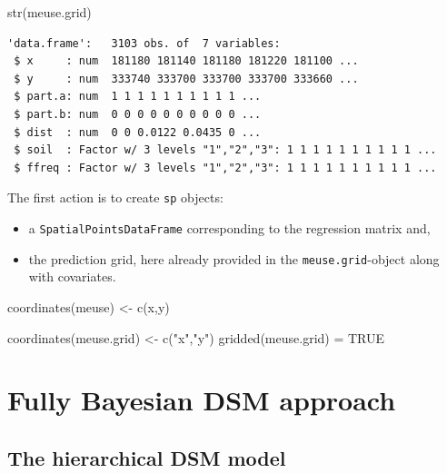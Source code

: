 \documentclass[
  a4paper,
]{article}
\newenvironment{Shaded}{\begin{snugshade}}{\end{snugshade}}
\newcommand{\ConstantTok}[1]{\textcolor[rgb]{0.56,0.35,0.01}{#1}}
\newcommand{\FunctionTok}[1]{\textcolor[rgb]{0.28,0.35,0.67}{#1}}
\newcommand{\NormalTok}[1]{\textcolor[rgb]{0.00,0.23,0.31}{#1}}
\newcommand{\OtherTok}[1]{\textcolor[rgb]{0.00,0.23,0.31}{#1}}
\newcommand{\StringTok}[1]{\textcolor[rgb]{0.13,0.47,0.30}{#1}}
\begin{document}
\begin{Shaded}
\begin{Highlighting}[]
\FunctionTok{str}\NormalTok{(meuse.grid)}
\end{Highlighting}
\end{Shaded}

\begin{verbatim}
'data.frame':   3103 obs. of  7 variables:
 $ x     : num  181180 181140 181180 181220 181100 ...
 $ y     : num  333740 333700 333700 333700 333660 ...
 $ part.a: num  1 1 1 1 1 1 1 1 1 1 ...
 $ part.b: num  0 0 0 0 0 0 0 0 0 0 ...
 $ dist  : num  0 0 0.0122 0.0435 0 ...
 $ soil  : Factor w/ 3 levels "1","2","3": 1 1 1 1 1 1 1 1 1 1 ...
 $ ffreq : Factor w/ 3 levels "1","2","3": 1 1 1 1 1 1 1 1 1 1 ...
\end{verbatim}

The first action is to create \texttt{sp} objects:

\begin{itemize}
\item
  a \texttt{SpatialPointsDataFrame} corresponding to the regression
  matrix and,
\item
  the prediction grid, here already provided in the
  \texttt{meuse.grid}-object along with covariates.
\end{itemize}

\begin{Shaded}
\begin{Highlighting}[]
\FunctionTok{coordinates}\NormalTok{(meuse) }\OtherTok{\textless{}{-}} \FunctionTok{c}\NormalTok{(}\StringTok{\textquotesingle{}x\textquotesingle{}}\NormalTok{,}\StringTok{\textquotesingle{}y\textquotesingle{}}\NormalTok{)}

\FunctionTok{coordinates}\NormalTok{(meuse.grid) }\OtherTok{\textless{}{-}} \FunctionTok{c}\NormalTok{(}\StringTok{"x"}\NormalTok{,}\StringTok{"y"}\NormalTok{)}
\FunctionTok{gridded}\NormalTok{(meuse.grid) }\OtherTok{=} \ConstantTok{TRUE}
\end{Highlighting}
\end{Shaded}

\hypertarget{fully-bayesian-dsm-approach}{%
\section{Fully Bayesian DSM
approach}\label{fully-bayesian-dsm-approach}}

\hypertarget{the-hierarchical-dsm-model}{%
\subsection{The hierarchical DSM
model}\label{the-hierarchical-dsm-model}}
\end{document}
